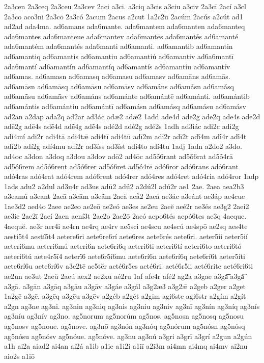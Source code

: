 {2a3cen
2a3ceq
2a3ceu
2a3cev
2aci
a3ci.
a3ciq
a3cis
a3ciu
a3civ
2a3cī
2ací
a3cl
2a3co
aco3ni
2a3cō
2a3có
2acum
2acus
a2cut
1a2c2ū
2acúm
2acús
a2cút
ad1
ad2ad
ada4ma.
ad6amans
ada6mante.
ada6mantem
ada6manten
ada6manteq
ada6mantes
ada6manteue
ada6mantev
ada6mantēs
ada6mantḗs
ad6amanté
ada6mantém
ada6mantés
ada6manti
ad6amanti.
ad6amantib
ad6amantin
ad6amantiq
ad6amantis
ad6amantiu
ad6amantiú
ad6amantiv
ad6a6mantī
ada6mantí
ad6amantín
ad6amantíq
ad6amantís
ad6amantíu
ad6amantív
ad6amas.
ad6amasn
ad6amasq
ad6amasu
ad6amasv
ad6amāns
ad6amās.
ad6amāsn
ad6amāsq
ad6amāsu
ad6amāsv
ad6amā́ns
ad6amā́sn
ad6amā́sq
ad6amā́su
ad6amā́sv
ad6amáns
ad6amánte
ad6amántē
ad6amánti.
ad6amántib
ad6amántis
ad6amántiu
ad6amántī
ad6amásn
ad6amásq
ad6amásu
ad6amásv
ad2an
a2dap
ada2q
ad2ar
ad3ác
adæ2
adǣ2
1add
ade4d
ade2g
ade2q
ade4s
adē2d
adē2g
adē4s
adḗ4d
adḗ4g
adḗ4s
adé2d
adé2g
adé2s
1adh
ad3iác
adi2c
adi2g
adi4mí
adi2r
adi4tā
adi4tǣ
adi4tī
adi4tū
adī2m
adī2r
adī2t
adī́4m
adī́4r
adī́4t
adí2b
adí2g
adí4mu
adí2r
ad3íss
ad3íst
adí4to
adí4tu
1adj
1adn
a2do2
a3do.
ad4oc
a3don
a3doq
a3dou
a3dov
adō2
ad4ōc
ad5ṓ6rant
ad5ṓ6rat
ad5ṓ4rā
ad5ṓ6rem
ad5ṓ6rent
ad5ṓ6rer
ad5ṓ6ret
ad5ṓ4rē
adṓ6ror
adó6rans
adó6rant
adó4ras
adó4rat
adó4rem
adó6rent
adó4rer
adó4res
adó4ret
adó4ria
adó4ror
1adp
1ads
adu2
a2dul
ad3u4r
ad3us
adū2
adū́2
a2dú2l
adú2r
ae1
2ae.
2aea
aea2b3
a3eamú
a3eant
2aeā
a3eām
a3eā́m
2aeă
aeắ2
2aeá
ae3ác
a3eánt
ae3áp
ae4cue
1ae3d2
aed4o
2aee
ae2eo
ae2eō
ae2eó
ae3es
ae2eu
2aeĕ
aeé2r
ae3és
ae3g2
2aei2
ae3ic
2ae2ī
2aeí
2aen
aení3t
2ae2o
2ae2ō
2aeó
aepo6tés
aepó6tes
ae3q
4aeque.
4aequĕ.
ae3r
aer4i
ae4rn
ae4rq
ae4rv
ae5sci
ae4scu
ae4scú
ae4spō
ae2sq
aes4te
aesti5t4
aestí5t4
aetere6ri
aete6re6rí
aete6res
aete6rés
aete6ri.
aeter5ii
aeter5ií
aeteri6mu
aeteri6mú
aeteri6n
aete6ri6q
aeteri6ti
aeteri6tí
aeteri6to
aeteri6tó
aeteri6tú
aete4r5ī4
aeterī́6
aete6r5í6mu
aete6rí6n
aete6rí6q
aete6rí6t
aeter5íti
aete6rí6u
aete6rí6v
a3e2tē
ae5tĕr
aeté6r5es
aeté6ri.
aeté6r5ii
aeté6rite
aeté6ri6ti
ae2un
ae3ut
2aeŭ
2aeú
aex2
ae2xu
aé2ru
1af
afe4r
afé2
ag2a
a3gae
a3ga͞
a3ga͡
a3gā.
a3gān
a3gāq
a3gāu
a3gāv
a3gáe
a3gál
a3g2æ3
a3g2ǣ
a2geb
a2ger
a2get
1a2gē
a3gē.
a3gēq
a3gēu
a3gēv
a2géb
a2gét
a2gim
agi6ste
agi6str
a2gím
a2gít
a2gn
ag3ne
ag3ni.
ag3nin
ag3niq
ag3nis
ag3niu
ag3niv
ag3nī
ag3nín
ag3níq
ag3nís
ag3níu
ag3nív
ag3no.
ag5norum
ag5norúm
ag5nos.
ag5nosn
ag5nosq
ag5nosu
ag5nosv
ag5noue.
ag5nove.
ag3nō
ag3nón
ag3nóq
ag5nórum
ag5nósn
ag5nósq
ag5nósu
ag5nósv
ag5nóue.
ag5nóve.
ag3nu
ag3nú
a3gri
a3grī
a3grí
a2gun
a2gún
a1h
ai2a
aiad2
ai4an
ai2á
a1ib
a1ie
a1i2i
a1iī
a2i3m
ai4mn
ai4mq
ai4mv
ai2nu
aio2s
a1iō
}
